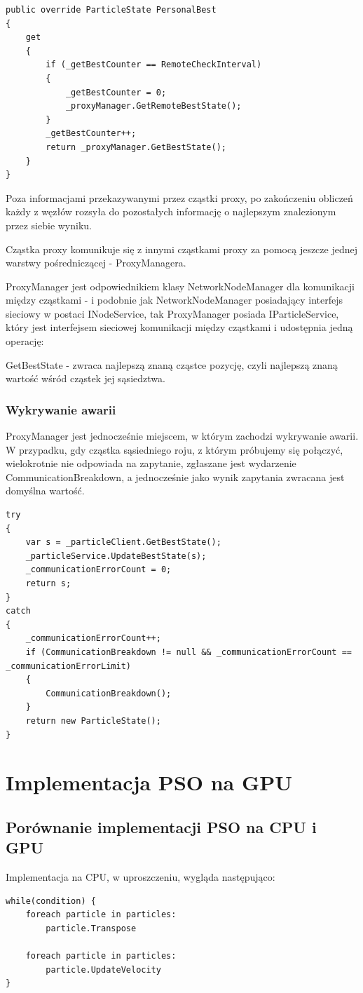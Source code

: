 \documentclass[12pt, twoside, openany, abstract=on]{report}
\theoremstyle{definition}
\begin{document}
\begin{lstlisting}[frame=single]
public override ParticleState PersonalBest
{
	get
	{
		if (_getBestCounter == RemoteCheckInterval)
		{
			_getBestCounter = 0;
			_proxyManager.GetRemoteBestState();
		}
		_getBestCounter++;
		return _proxyManager.GetBestState();
	}
}
\end{lstlisting}


Poza informacjami przekazywanymi przez cząstki proxy, po zakończeniu obliczeń każdy z węzłów rozsyła do pozostałych informację o najlepszym znalezionym przez siebie wyniku.

Cząstka proxy komunikuje się z innymi cząstkami proxy za pomocą jeszcze jednej warstwy pośredniczącej - ProxyManagera.

ProxyManager jest odpowiednikiem klasy NetworkNodeManager dla komunikacji między cząstkami - i podobnie jak NetworkNodeManager posiadający interfejs sieciowy w postaci INodeService, tak ProxyManager posiada IParticleService, który jest interfejsem sieciowej komunikacji między cząstkami i udostępnia jedną operację:

GetBestState - zwraca najlepszą znaną cząstce pozycję, czyli najlepszą znaną wartość wśród cząstek jej sąsiedztwa.
 

\subsubsection{Wykrywanie awarii}
ProxyManager jest jednocześnie miejscem, w którym zachodzi wykrywanie awarii. W przypadku, gdy cząstka sąsiedniego roju, z którym próbujemy się połączyć, wielokrotnie nie odpowiada na zapytanie, zgłaszane jest wydarzenie CommunicationBreakdown, a jednocześnie jako wynik zapytania zwracana jest domyślna wartość.

\begin{lstlisting}[frame=single]
try
{
	var s = _particleClient.GetBestState();
	_particleService.UpdateBestState(s);
	_communicationErrorCount = 0;
	return s;
}
catch
{
	_communicationErrorCount++;
	if (CommunicationBreakdown != null && _communicationErrorCount == 						_communicationErrorLimit)
	{
		CommunicationBreakdown();		
	}
	return new ParticleState();
}
\end{lstlisting}


\newpage

\section{Implementacja PSO na GPU}
\subsection{Porównanie implementacji PSO na CPU i GPU}
Implementacja na CPU, w uproszczeniu, wygląda następująco:
\begin{lstlisting}[frame=single]
while(condition) {
	foreach particle in particles:
		particle.Transpose

	foreach particle in particles:
		particle.UpdateVelocity
}
\end{lstlisting}
\end{document}
